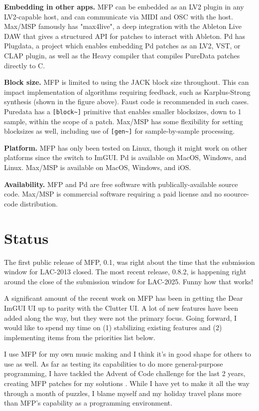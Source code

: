 \documentclass[a4paper]{article}
\def\:{\hskip0pt}
\begin{document}
{\bf Embedding in other apps.} MFP can be embedded as an LV2
plugin in any LV2-capable host, and can communicate via MIDI and
OSC with the host. Max/MSP famously has "max4live", a deep
integration with the Ableton Live DAW that gives a structured API
for patches to interact with Ableton. Pd has Plugdata, a project
which enables embedding Pd patches as an LV2, VST, or CLAP
plugin, as well as the Heavy compiler that compiles PureData
patches directly to C.

{\bf Block size.} MFP is limited to using the JACK block size
throughout. This can impact implementation of algorithms
requiring feedback, such as Karplus-Strong synthesis (shown in
the figure above). Faust code is recommended in such cases.
Puredata has a {\tt [block\textasciitilde]} primitive that
enables smaller blocksizes, down to 1 sample, within the scope of
a patch. Max/MSP has some flexibility for setting blocksizes as
well, including use of {\tt [gen\textasciitilde]} for
sample-by-sample processing.

{\bf Platform.} MFP has only been tested on Linux, though it
might work on other platforms since the switch to ImGUI. Pd is
available on MacOS, Windows, and Linux. Max/MSP is available on
MacOS, Windows, and iOS.

{\bf Availability.} MFP and Pd are free software with
publically-available source code. Max/MSP is commercial software
requiring a paid license and no soource-code distribution.


\section{Status}

The first public release of MFP, 0.1, was right about the time that the
submission window for LAC-2013 closed. The most recent release,
0.8.2, is happening right around the close of the submission window
for LAC-2025. Funny how that works!

A significant amount of the recent work on MFP has been in
getting the Dear ImGUI UI up to parity with the Clutter UI. A lot
of new features have been added along the way, but they were not
the primary focus. Going forward, I would like to spend my time
on (1) stabilizing existing features and (2) implementing items
from the priorities list below.

I use MFP for my own music making and I think it's in good shape
for others to use as well. As far as testing its capabilities to
do more general\:-\:purpose programming, I have tackled the
Advent of Code \cite{AdventOfCode} challenge for the last 2
years, creating MFP patches for my solutions
\cite{Gribble:Advent}. While I have yet to make it all the way
through a month of puzzles, I blame myself and my holiday travel
plans more than MFP's capability as a programming environment.
\end{document}
